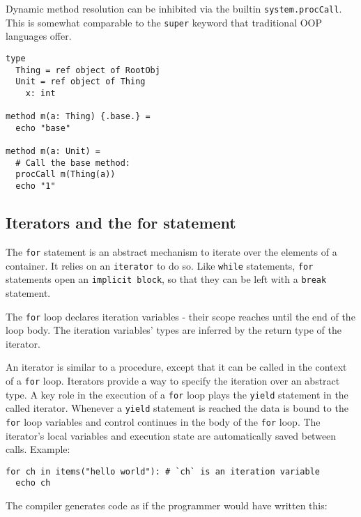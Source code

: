 Dynamic method resolution can be inhibited via the builtin
\texttt{system.procCall}. This is somewhat comparable to the
\texttt{super} keyword that traditional OOP languages offer.

\begin{verbatim}
type
  Thing = ref object of RootObj
  Unit = ref object of Thing
    x: int

method m(a: Thing) {.base.} =
  echo "base"

method m(a: Unit) =
  # Call the base method:
  procCall m(Thing(a))
  echo "1"
\end{verbatim}

\hypertarget{iterators-and-the-for-statement}{%
\subsection{Iterators and the for
statement}\label{iterators-and-the-for-statement}}

The \texttt{for} statement is an abstract mechanism to iterate over the
elements of a container. It relies on an \texttt{iterator} to do so.
Like \texttt{while} statements, \texttt{for} statements open an
\texttt{implicit\ block}, so that they can be left with a \texttt{break}
statement.

The \texttt{for} loop declares iteration variables - their scope reaches
until the end of the loop body. The iteration variables' types are
inferred by the return type of the iterator.

An iterator is similar to a procedure, except that it can be called in
the context of a \texttt{for} loop. Iterators provide a way to specify
the iteration over an abstract type. A key role in the execution of a
\texttt{for} loop plays the \texttt{yield} statement in the called
iterator. Whenever a \texttt{yield} statement is reached the data is
bound to the \texttt{for} loop variables and control continues in the
body of the \texttt{for} loop. The iterator's local variables and
execution state are automatically saved between calls. Example:

\begin{verbatim}
for ch in items("hello world"): # `ch` is an iteration variable
  echo ch
\end{verbatim}

The compiler generates code as if the programmer would have written
this:

\begin{verbatim}
\end{verbatim}

